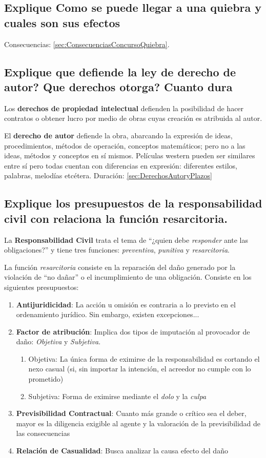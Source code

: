 \documentclass{article}
\begin{document}
\subsection{Explique Como se puede llegar a una quiebra y cuales son sus efectos}
Consecuencias: \ref{sec:ConsecuenciasConcursoQuiebra}.
\subsection{Explique que defiende la ley de derecho de autor? Que derechos otorga? Cuanto dura}
	Los \textbf{derechos de propiedad intelectual} defienden la posibilidad de hacer contratos o obtener lucro por medio de obras cuyas creación es atribuida al autor.
    
	El \textbf{derecho de autor} defiende la obra, abarcando la expresión de ideas, procedimientos, métodos de operación, conceptos matemáticos; pero no a las ideas, métodos y conceptos en sí mismos.
	Películas western pueden ser similares entre sí pero todas cuentan con diferencias en expresión: diferentes estilos, palabras, melodías etcétera.
	Duración: \ref{sec:DerechosAutoryPlazos}

\subsection{Explique los presupuestos de la responsabilidad civil con relaciona la función resarcitoria.} \label{ssec:funcresarcitoria}
\label{sec:ResponsabilidadCivilyFuncionResarcitoria}
La \textbf{Responsabilidad Civil} trata el tema de ``¿quien debe \textit{responder} ante las obligaciones?'' y tiene tres funciones: \textit{preventiva}, \textit{punitiva} y \textit{resarcitoria}. 

La función \textit{resarcitoria} consiste en la reparación del daño generado por la violación de ``no dañar'' o el incumplimiento de una obligación. Consiste en los siguientes presupuestos:

\begin{enumerate}
    \item \textbf{Antijuridicidad}: La acción u omisión es contraria a lo previsto en el ordenamiento jurídico. Sin embargo, existen excepciones...
    \item \textbf{Factor de atribución}: Implica dos tipos de imputación al provocador de daño: \textit{Objetiva} y \textit{Subjetiva}.
    \begin{enumerate}
        \item Objetiva: La única forma de eximirse de la responsabilidad es cortando el nexo casual (si, sin importar la intención, el acreedor no cumple con lo prometido)
        \item Subjetiva: Forma de eximirse mediante el \textit{dolo} y la \textit{culpa}
    \end{enumerate}
    \item \textbf{Previsibilidad Contractual}: Cuanto más grande o crítico sea el deber, mayor es la diligencia exigible al agente y la valoración de la previsibilidad de las consecuencias
    \item \textbf{Relación de Casualidad}: Busca analizar la causa efecto del daño
\end{enumerate}
\end{document}
